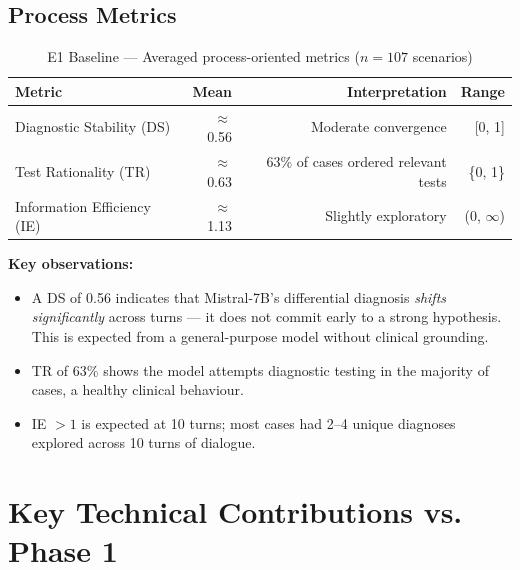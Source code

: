 \documentclass[12pt, a4paper]{article}
\begin{document}
\subsection{Process Metrics}

\begin{table}[H]
\centering
\caption{E1 Baseline — Averaged process-oriented metrics ($n=107$ scenarios)}
\begin{tabular}{@{}lrrr@{}}
\toprule
\textbf{Metric} & \textbf{Mean} & \textbf{Interpretation} & \textbf{Range} \\
\midrule
Diagnostic Stability (DS) & $\approx$ 0.56 & Moderate convergence & {[0, 1]} \\
Test Rationality (TR)     & $\approx$ 0.63 & 63\% of cases ordered relevant tests & \{0, 1\} \\
Information Efficiency (IE) & $\approx$ 1.13 & Slightly exploratory & (0, $\infty$) \\
\bottomrule
\end{tabular}
\end{table}

\noindent\textbf{Key observations:}
\begin{itemize}
    \item A DS of 0.56 indicates that Mistral-7B's differential diagnosis \textit{shifts significantly} across turns — it does not commit early to a strong hypothesis. This is expected from a general-purpose model without clinical grounding.
    \item TR of 63\% shows the model attempts diagnostic testing in the majority of cases, a healthy clinical behaviour.
    \item IE $> 1$ is expected at 10 turns; most cases had 2--4 unique diagnoses explored across 10 turns of dialogue.
\end{itemize}

\section{Key Technical Contributions vs. Phase 1}
\end{document}
